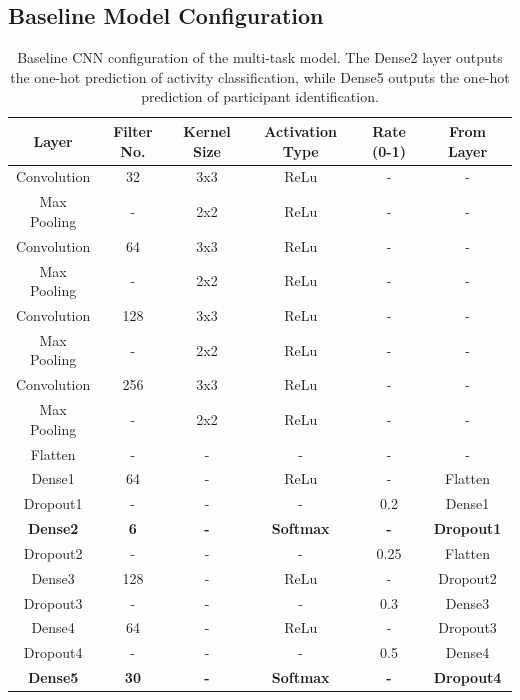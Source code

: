 \documentclass{l4proj}
\begin{document}
\begin{appendices}
\subsection{Baseline Model Configuration}
\begin{table}[h]
    \centering
    \begin{tabular}{cccccc}
        \toprule
        \textbf{Layer} & \textbf{Filter No.} & \textbf{Kernel Size} & \textbf{Activation Type} & \textbf{Rate (0-1)} & \textbf{From Layer}\\
        \midrule
        \midrule
        Convolution & 32  & 3x3 & ReLu & - & -\\
        Max Pooling & - & 2x2 & ReLu & - & -\\
        Convolution & 64 & 3x3 & ReLu & - & -\\
        Max Pooling & - & 2x2 & ReLu & - & -\\
        Convolution & 128 & 3x3 & ReLu & - & -\\
        Max Pooling & - & 2x2 & ReLu & - & -\\
        Convolution & 256 & 3x3 & ReLu & - & -\\
        Max Pooling & - & 2x2 & ReLu & - & -\\
        Flatten & - & - & - & - & -\\
        Dense1 & 64 & - & ReLu & - & Flatten\\
        Dropout1 & - & - & - & 0.2 & Dense1\\
        \textbf{Dense2} & \textbf{6} & \textbf{-} & \textbf{Softmax} & \textbf{-} & \textbf{Dropout1} \\
        Dropout2 & - & - & - & 0.25 & Flatten\\
        Dense3 & 128 & - & ReLu & - & Dropout2\\
        Dropout3 & - & - & - & 0.3 & Dense3\\
        Dense4 & 64 & - & ReLu & - & Dropout3\\
        Dropout4 & - & - & - & 0.5 & Dense4\\
        \textbf{Dense5} & \textbf{30} & \textbf{-} & \textbf{Softmax} & \textbf{-} & \textbf{Dropout4} \\
        \bottomrule
    \end{tabular}
    \caption{Baseline CNN configuration of the multi-task model. The Dense2 layer outputs the one-hot prediction of activity classification, while Dense5 outputs the one-hot prediction of participant identification.}
    \label{tab:multitask-initial-CNN-configuration}
\end{table}


\end{appendices}
\end{document}
